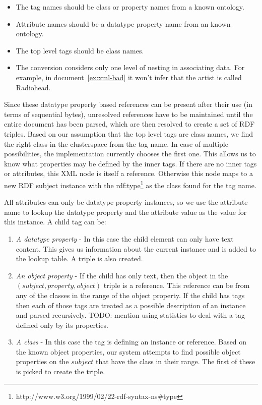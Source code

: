 \documentclass[journal]{IEEEtran}
\begin{document}
\begin{itemize}
    \item The tag names should be class or property names from a known ontology.
    \item Attribute names should be a datatype property name from an known
        ontology.
    \item The top level tags should be class names.
    \item The conversion considers only one level of nesting in associating
        data. For example, in document~\ref{ex:xml-bad} it won't infer that the
        artist is called Radiohead.
\end{itemize}

Since these datatype property based references can be present after their use
(in terms of sequential bytes), unresolved references have to be maintained
until the entire document has been parsed, which are then resolved to create
a set of RDF triples. Based on our assumption that the top level tags are class
names, we find the right class in the clusterspace from the tag name. In case
of multiple possibilities, the implementation currently chooses the first one.
This allows us to know what properties may be defined by the inner tags. If
there are no inner tags or attributes, this XML node is itself a reference.
Otherwise this node maps to a new RDF subject instance with the
rdf:type\footnote{http://www.w3.org/1999/02/22-rdf-syntax-ns\#type} as the
class found for the tag name.

All attributes can only be datatype property instances, so we use the attribute
name to lookup the datatype property and the attribute value as the value for
this instance. A child tag can be:
\begin{enumerate}
    \item \emph{A datatype property} - In this case the child element can only
        have text content. This gives us information about the current instance
        and is added to the lookup table. A triple is also created.
    \item \emph{An object property} - If the child has only text, then the
        object in the $(subject, property, object)$ triple is a reference. This
        reference can be from any of the classes in the range of the object
        property. If the child has tags then each of those tags are treated as
        a possible description of an instance and parsed recursively. TODO:
        mention using statistics to deal with a tag defined only by its
        properties.
    \item \emph{A class} - In this case the tag is defining an instance or
        reference. Based on the known object properties, our system attempts to
        find possible object properties on the $subject$ that have the class in
        their range. The first of these is picked to create the triple.
\end{enumerate}
\end{document}
